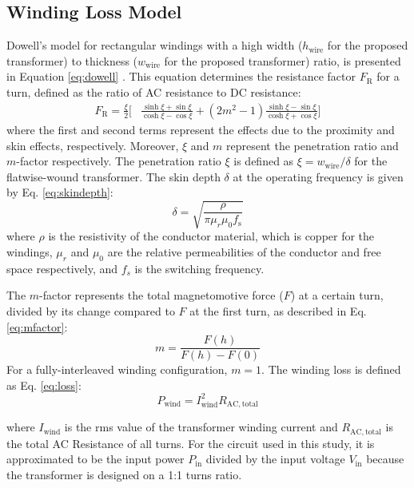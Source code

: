 \subsection{Winding Loss Model}
Dowell's model for rectangular windings with a high width ($h_{\mathrm{wire}}$ for the proposed transformer) to thickness ($w_{\mathrm{wire}}$ for the proposed transformer) ratio, is presented in Equation \ref{eq:dowell} \cite{ref15, ref16}. This equation determines the resistance factor $F_{\mathrm{R}}$ for a turn, defined as the ratio of AC resistance to DC resistance:
\begin{equation}
\begin{split}
F_{\mathrm{R}} = \frac{\xi}{2} \Bigg[ &\frac{\sinh \xi + \sin \xi}{\cosh \xi - \cos \xi} + (2m^2 - 1) \frac{\sinh \xi - \sin \xi}{\cosh \xi + \cos \xi} \Bigg]
\end{split}
\label{eq:dowell}
\end{equation}
\noindent where the first and second terms represent the effects due to the proximity and skin effects, respectively. Moreover, $\xi$ and $m$ represent the penetration ratio and $m$-factor respectively. The penetration ratio $\xi$ is defined as $\xi = w_{\mathrm{wire}}/\delta$ for the flatwise-wound transformer. The skin depth $\delta$  at the operating frequency is given by Eq. \ref{eq:skindepth}:
\begin{equation}
\delta = \sqrt{\frac{\rho}{\pi \mu_r \mu_0 f_\mathrm{s}}}
\label{eq:skindepth}
\end{equation}
\noindent where $\rho$ is the resistivity of the conductor material, which is copper for the windings, $\mu_r$ and $\mu_0$ are the relative permeabilities of the conductor and free space respectively, and $f_s$ is the switching frequency.

The $m$-factor represents the total magnetomotive force ($F$) at a certain turn, divided by its change compared to $F$ at the first turn, as described in Eq. \ref{eq:mfactor}:
\begin{equation}
m = \frac{F(h)}{F(h)-F(0)}
\label{eq:mfactor}
\end{equation}
\noindent For a fully-interleaved winding configuration, $m = 1$.
The winding loss is defined as Eq. \ref{eq:loss}:
\begin{equation}
P_{\mathrm{wind}} = I_{\mathrm{wind}}^2 R_{\mathrm{AC, total}}
\label{eq:loss}
\end{equation}

\noindent where $I_{\mathrm{wind}}$ is the rms value of the transformer winding current and $R_{\mathrm{AC, total}}$ is the total AC Resistance of all turns. For the circuit used in this study, it is approximated to be the input power $P_{\mathrm{in}}$ divided by the input voltage $V_{\mathrm{in}}$ because the transformer is designed on a 1:1 turns ratio.  

